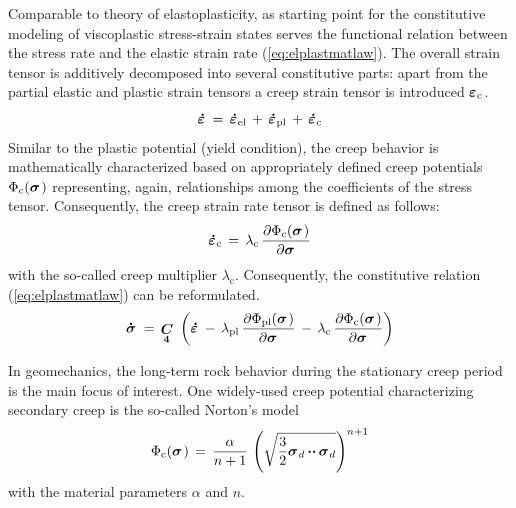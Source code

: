 Comparable to theory of elastoplasticity, as starting point for the constitutive modeling of viscoplastic stress-strain states serves the functional relation between the stress rate and the elastic strain rate (\ref{eq:elplastmatlaw}). The overall strain tensor is additively decomposed into several constitutive parts: apart from the partial elastic and plastic strain tensors a creep strain tensor is introduced $\mbox{${\mbox{\boldmath${\varepsilon}$\unboldmath}}_{\:\!\mathrm{c}}$}$.
\begin{equation}
\miu{\varepsilon}{}{\dot}\,=\,\miu{\varepsilon}{\mathrm{el}}{\dot}\,+\,\miu{\varepsilon}{\mathrm{pl}}{\dot}\,+\,\miu{\varepsilon}{\mathrm{c}}{\dot}
\label{eq:strainsplit_vpl}
\end{equation}
Similar to the plastic potential (yield condition), the creep behavior is mathematically characterized based on appropriately defined creep potentials $\Phi_{\mathrm{c}}(\mbox{${\mbox{\boldmath${\sigma}$\unboldmath}}_{\:\!}$})$ representing, again, relationships among the coefficients of the stress tensor. Consequently, the creep strain rate tensor is defined as follows:
\begin{equation}
\miu{\varepsilon}{\mathrm{c}}{\dot}\,=\,
\lambda_{\mathrm{c}}\,\frac{\partial\Phi_{\mathrm{c}}(\miu{\sigma}{}{})}{\partial\miu{\sigma}{}{}}
\label{eq:creepstrainrate}
\end{equation}
with the so-called creep multiplier $\lambda_{\mathrm{c}}$. Consequently, the constitutive relation (\ref{eq:elplastmatlaw}) can be
reformulated. 
\begin{equation}
\miu{\sigma}{}{\dot}\,=\,\fourtens{C}
\left(\miu{\varepsilon}{}{\dot}\,-\,
\lambda_{\mathrm{pl}}\,\frac{\partial\Phi_{\mathrm{pl}}(\miu{\sigma}{}{})}{\partial\miu{\sigma}{}{}}
\,-\,
\lambda_{\mathrm{c}}\,\frac{\partial\Phi_{\mathrm{c}}(\miu{\sigma}{}{})}{\partial\miu{\sigma}{}{}}
\right)
\label{eq:vplastmatlawmod}
\end{equation}

In geomechanics, the long-term rock behavior during the stationary creep period is the main focus of interest. One widely-used creep potential characterizing secondary creep is the so-called Norton's model
\begin{equation}
\Phi_{\mathrm{c}}(\miu{\sigma}{}{})\,=\,
\frac{\alpha}{n+1}\,
\left(\sqrt{\ttfrac{3}{2}\miu{\sigma}{d}{}\ccdot\miu{\sigma}{d}{}}\right)^{n+1}
\label{eq:norton}
\end{equation}
with the material parameters $\alpha$ and $n$.

